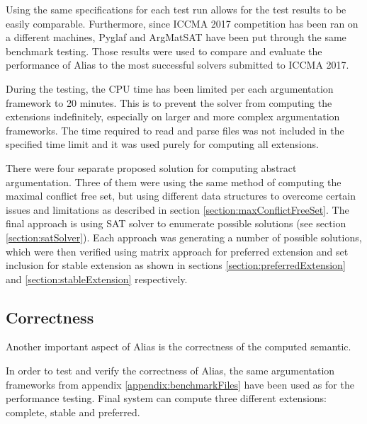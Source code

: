 Using the same specifications for each test run allows for the test results to be easily comparable. Furthermore, since ICCMA 2017 competition has been ran on a different machines, Pyglaf \citep{pyglaf} and ArgMatSAT \citep{argmatSat} have been put through the same benchmark testing. Those results were used to compare and evaluate the performance of Alias to the most successful solvers submitted to ICCMA 2017.

During the testing, the CPU time has been limited per each argumentation framework to 20 minutes. This is to prevent the solver from computing the extensions indefinitely, especially on larger and more complex argumentation frameworks. The time required to read and parse files was not included in the specified time limit and it was used purely for computing all extensions. 

There were four separate proposed solution for computing abstract argumentation. Three of them were using the same method of computing the maximal conflict free set, but using different data structures to overcome certain issues and limitations as described in section \ref{section:maxConflictFreeSet}. The final approach is using SAT solver to enumerate possible solutions (see section \ref{section:satSolver}). Each approach was generating a number of possible solutions, which were then verified using matrix approach for preferred extension and set inclusion for stable extension as shown in sections \ref{section:preferredExtension} and \ref{section:stableExtension} respectively. 


\subsection{Correctness}
Another important aspect of Alias is the correctness of the computed semantic. 

In order to test and verify the correctness of Alias, the same argumentation frameworks from appendix \ref{appendix:benchmarkFiles} have been used as for the performance testing. Final system can compute three different extensions: complete, stable and preferred. 
